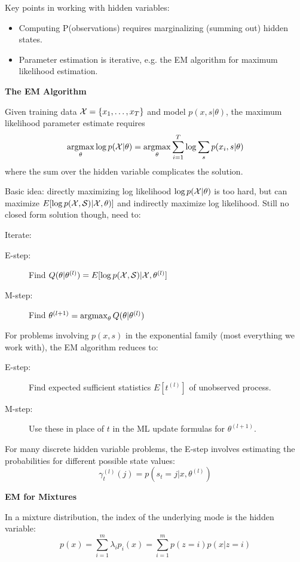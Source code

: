 \documentclass[11pt,titlepage]{article}
\def\argmax{\mathop {\rm argmax}}
\begin{document}
Key points in working with hidden variables:
\begin{itemize}
\item Computing P(observations) requires marginalizing (summing out)
hidden states.  
\item Parameter estimation is iterative, e.g. the EM algorithm
for maximum likelihood estimation.
\end{itemize}

\clearpage

\centerline{{\LARGE \bf The EM Algorithm}}
\vskip 0.2in

Given training data ${\cal X} = \{ x_1, \ldots , x_T\}$ and model 
$p(x,s|\theta)$, the maximum likelihood parameter estimate requires
$$\argmax_\theta \log p({\cal X}|\theta) = 
    \argmax_\theta \sum_{i=1}^T\log \sum_s p(x_i,s|\theta)$$
where the sum over the hidden variable complicates the solution.
\vskip 0.2in

Basic idea: directly maximizing log likelihood 
$\log p({\cal X}|\theta)$ is too hard, but can maximize 
$E[\log p({\cal X},{\cal S})|{\cal X},\theta)]$ and indirectly maximize 
log likelihood. Still no closed form solution though, need to:

Iterate:
\begin{description}
\item[E-step:] Find $Q(\theta |\theta^{(l)}) = E[\log p({\cal X},{\cal S})|{\cal X},\theta^{(l)}]$
\item[M-step:] Find $\theta^{(l+1)} = \argmax_\theta Q(\theta |\theta^{(l)})$
\end{description}

\vskip 0.4in
For problems involving $p(x,s)$ in the exponential family (most everything we work with), the EM algorithm reduces to:
\begin{description}
\item[E-step:] Find expected sufficient statistics $E[t^{(l)}]$ of unobserved process.
\item[M-step:] Use these in place of $t$ in the ML update formulas for $\theta^{(l+1)}$.
\end{description}

\vskip 0.4in
For many discrete hidden variable problems, the E-step involves 
estimating the probabilities for different possible state values:
$$\gamma_t^{(l)}(j) = p(s_t = j|x,\theta^{(l)})$$

\clearpage

{\bf EM for Mixtures}

In a mixture distribution, the index of the underlying
mode is the hidden variable:
$$p(x) = \sum_{i=1}^m \lambda_i p_i(x) = \sum_{i=1}^m p(z=i) p(x|z=i)$$
\end{document}
